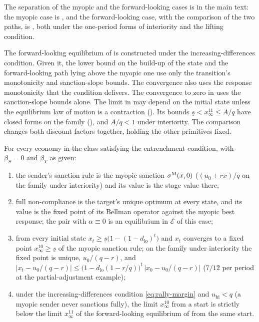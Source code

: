 The separation of the myopic and the forward-looking cases is in the main text: the myopic case is ,
and the forward-looking case, with the comparison of the two paths, is
, both under the one-period forms of interiority and
the lifting condition.

 The forward-looking
equilibrium of  is constructed under the increasing-differences condition. Given it, the lower bound on the build-up of the state
and the forward-looking path lying above the myopic one use only the transition's
monotonicity and sanction-slope bounds. The convergence also uses the response
monotonicity that the condition delivers. The convergence to zero in
 uses the sanction-slope bounds alone. The limit in
 may depend on the initial state unless the
equilibrium law of motion is a contraction ().
Its bounds $\underline s<x^{11}_\infty\le A/q$ have closed forms on the family
(), and $A/q<1$ under interiority. The comparison changes
both discount factors together, holding the other primitives fixed.

\begin{proposition}
\label{prop:target-only}
For every economy in the class satisfying the entrenchment condition, with
$\beta_S=0$ and $\beta_T$ as given:
\begin{enumerate}[label=(\roman*)]
\item the sender's sanction rule is the myopic sanction $\sigma^{\mathrm{M}}(x,0)$
($(u_0+rx)/q$ on the family under interiority) and its value is the stage
value there;
\item full non-compliance is the target's unique optimum at every state, and its
value is the fixed point of its Bellman operator against the myopic best response;
the pair with $\alpha\equiv0$ is an equilibrium in $\mathcal E$ of this
case;
\item from every initial state $x_t\ge\underline s\bigl(1-(1-d_{\mathrm{lo}})^t\bigr)$
and $x_t$ converges to a fixed point $x^{10}_\infty\ge\underline s$ of the myopic sanction rule;
on the family under interiority the fixed point is unique, $u_0/(q-r)$, and
$\bigl|x_t-u_0/(q-r)\bigr|\le\bigl(1-d_{\mathrm{lo}}(1-r/q)\bigr)^t\,\bigl|x_0-u_0/(q-r)\bigr|$
($7/12$ per period at the partial-adjustment example);
\item under the increasing-differences condition \eqref{eq:rally-margin} and
$u_{\mathrm{hi}}<q$ (a myopic sender never sanctions fully), the limit $x^{10}_\infty$ from a
start is strictly below the limit $x^{11}_\infty$ of the forward-looking equilibrium of
 from the same start.
\end{enumerate}
\end{proposition}

